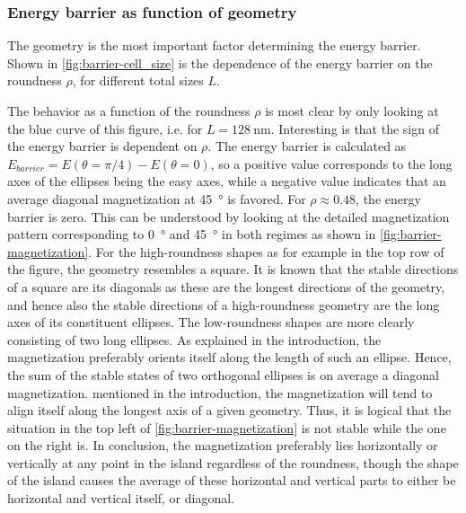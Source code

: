 \documentclass[12pt,a4paper]{article}
\begin{document}
\subsubsection{Energy barrier as function of geometry}
The geometry is the most important factor determining the energy barrier. Shown in \cref{fig:barrier-cell_size} is the dependence of the energy barrier on the roundness $\rho$, for different total sizes $L$. \par 
The behavior as a function of the roundness $\rho$ is most clear by only looking at the blue curve of this figure, i.e. for $L=\SI{128}{\nano\metre}$. Interesting is that the sign of the energy barrier is dependent on $\rho$. The energy barrier is calculated as $E_{barrier} = E(\theta=\pi/4) - E(\theta=0)$, so a positive value corresponds to the long axes of the ellipses being the easy axes, while a negative value indicates that an average diagonal magnetization at \SI{45}{\degree} is favored. For $\rho \approx 0.48$, the energy barrier is zero.
This can be understood by looking at the detailed magnetization pattern corresponding to \SI{0}{\degree} and \SI{45}{\degree} in both regimes as shown in \cref{fig:barrier-magnetization}. For the high-roundness shapes as for example in the top row of the figure, the geometry resembles a square. It is known that the stable directions of a square are its diagonals as these are the longest directions of the geometry, and hence also the stable directions of a high-roundness geometry are the long axes of its constituent ellipses. The low-roundness shapes are more clearly consisting of two long ellipses. As explained in the introduction, the magnetization preferably orients itself along the length of such an ellipse. Hence, the sum of the stable states of two orthogonal ellipses is on average a diagonal magnetization. mentioned in the introduction, the magnetization will tend to align itself along the longest axis of a given geometry. Thus, it is logical that the situation in the top left of \cref{fig:barrier-magnetization} is not stable while the one on the right is. In conclusion, the magnetization preferably lies horizontally or vertically at any point in the island regardless of the roundness, though the shape of the island causes the average of these horizontal and vertical parts to either be horizontal and vertical itself, or diagonal.
\end{document}
